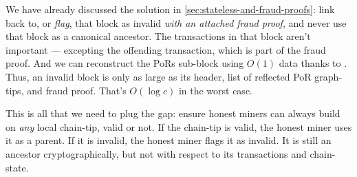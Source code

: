 We have already discussed the solution in \autoref{sec:stateless-and-fraud-proofs}: link back to, or \emph{flag}, that block as invalid \emph{with an attached fraud proof}, and never use that block as a canonical ancestor.
The transactions in that block aren't important --- excepting the offending transaction, which is part of the fraud proof.
And we can reconstruct the PoRs sub-block using $O(1)$ data thanks to \AxOfMaximalReflection.
Thus, an invalid block is only as large as its header, list of reflected PoR graph-tips, and fraud proof.
That's $O(\log c)$ in the worst case.


This is all that we need to plug the gap: ensure honest miners can always build on \emph{any} local chain-tip, valid or not.
If the chain-tip is valid, the honest miner uses it as a parent.
If it is invalid, the honest miner flags it as invalid.
It is still an ancestor cryptographically, but not with respect to its transactions and chain-state.





